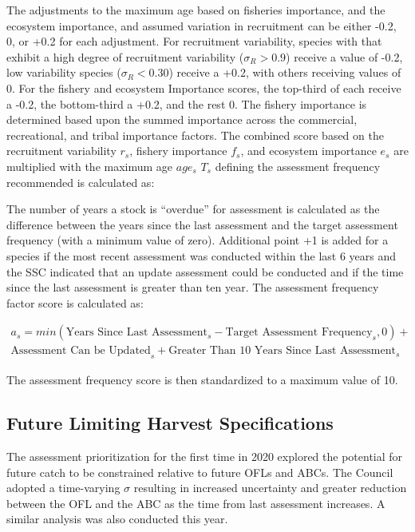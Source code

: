 \documentclass[11pt,
  english,
  a4paper,
]{article}
\begin{document}
The adjustments to the maximum age based on fisheries importance, and the ecosystem importance, and assumed variation in recruitment can be either -0.2, 0, or +0.2 for each adjustment. For recruitment variability, species with that exhibit a high degree of recruitment variability (\(\sigma_R > 0.9\)) receive a value of -0.2, low variability species (\(\sigma_R < 0.30\)) receive a +0.2, with others receiving values of 0. For the fishery and ecosystem Importance scores, the top-third of each receive a -0.2, the bottom-third a +0.2, and the rest 0. The fishery importance is determined based upon the summed importance across the commercial, recreational, and tribal importance factors. The combined score based on the recruitment variability \(r_s\), fishery importance \(f_s\), and ecosystem importance \(e_s\) are multiplied with the maximum age \(age_s\) \(T_s\) defining the assessment frequency recommended is calculated as:

The number of years a stock is ``overdue'' for assessment is calculated as the difference between the years since the last assessment and the target assessment frequency (with a minimum value of zero). Additional point +1 is added for a species if the most recent assessment was conducted within the last 6 years and the SSC indicated that an update assessment could be conducted and if the time since the last assessment is greater than ten year. The assessment frequency factor score is calculated as:

\[
\begin{aligned}
a_s = min(\text{Years Since Last Assessment}_s - \text{Target Assessment Frequency}_s, 0) + \\ \text{Assessment Can be Updated}_s + \text{Greater Than 10 Years Since Last Assessment}_s 
\end{aligned}
\]

The assessment frequency score is then standardized to a maximum value of 10.

\hypertarget{future-spex-sec}{%
\subsection{Future Limiting Harvest Specifications}\label{future-spex-sec}}

The assessment prioritization for the first time in 2020 explored the potential for future catch to be constrained relative to future OFLs and ABCs. The Council adopted a time-varying \(\sigma\) resulting in increased uncertainty and greater reduction between the OFL and the ABC as the time from last assessment increases. A similar analysis was also conducted this year.
\end{document}
